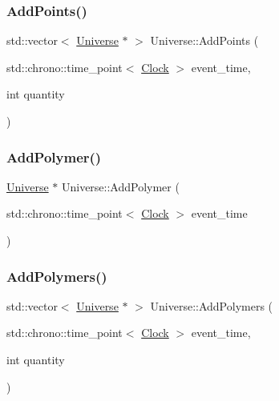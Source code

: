 \mbox{\label{classUniverse_aa48ced2078ba863723050d8283b3fa67}} 
\subsubsection{\texorpdfstring{Add\+Points()}{AddPoints()}}
{\footnotesize\ttfamily std\+::vector$<$ \mbox{\hyperlink{classUniverse}{Universe}} $\ast$ $>$ Universe\+::\+Add\+Points (\begin{DoxyParamCaption}\item[{std\+::chrono\+::time\+\_\+point$<$ \mbox{\hyperlink{universe_8h_a0ef8d951d1ca5ab3cfaf7ab4c7a6fd80}{Clock}} $>$}]{event\+\_\+time,  }\item[{int}]{quantity }\end{DoxyParamCaption})}

\mbox{\label{classUniverse_a4ea0af5d2eb7b5070a83f7da29526fbd}} 
\subsubsection{\texorpdfstring{Add\+Polymer()}{AddPolymer()}}
{\footnotesize\ttfamily \mbox{\hyperlink{classUniverse}{Universe}} $\ast$ Universe\+::\+Add\+Polymer (\begin{DoxyParamCaption}\item[{std\+::chrono\+::time\+\_\+point$<$ \mbox{\hyperlink{universe_8h_a0ef8d951d1ca5ab3cfaf7ab4c7a6fd80}{Clock}} $>$}]{event\+\_\+time }\end{DoxyParamCaption})}

\mbox{\label{classUniverse_aed7cb25507d516a2821ebb69d5345c54}} 
\subsubsection{\texorpdfstring{Add\+Polymers()}{AddPolymers()}}
{\footnotesize\ttfamily std\+::vector$<$ \mbox{\hyperlink{classUniverse}{Universe}} $\ast$ $>$ Universe\+::\+Add\+Polymers (\begin{DoxyParamCaption}\item[{std\+::chrono\+::time\+\_\+point$<$ \mbox{\hyperlink{universe_8h_a0ef8d951d1ca5ab3cfaf7ab4c7a6fd80}{Clock}} $>$}]{event\+\_\+time,  }\item[{int}]{quantity }\end{DoxyParamCaption})}


